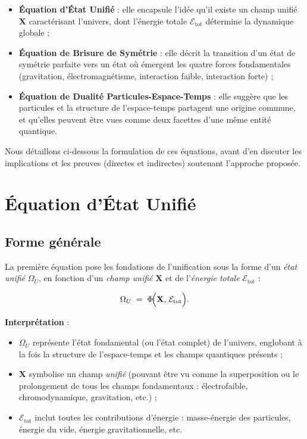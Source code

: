 \documentclass[12pt]{article}
\begin{document}
\begin{itemize}
    \item \textbf{Équation d'État Unifié} : elle encapsule l'idée qu'il existe un champ unifié 
          $\mathbf{X}$ caractérisant l'univers, dont l'énergie totale $\mathcal{E}_\mathrm{tot}$ 
          détermine la dynamique globale ;
    \item \textbf{Équation de Brisure de Symétrie} : elle décrit la transition d'un état de 
          symétrie parfaite vers un état où émergent les quatre forces fondamentales (gravitation, 
          électromagnétisme, interaction faible, interaction forte) ;
    \item \textbf{Équation de Dualité Particules-Espace-Temps} : elle suggère que les 
          particules et la structure de l'espace-temps partagent une origine commune, et 
          qu'elles peuvent être vues comme deux facettes d'une même entité quantique.
\end{itemize}

Nous détaillons ci-dessous la formulation de ces équations, avant d'en discuter 
les implications et les preuves (directes et indirectes) soutenant l'approche proposée.

\section{Équation d'État Unifié}

\subsection{Forme générale}

La première équation pose les fondations de l'unification sous la forme d'un \emph{état unifié} 
$\Omega_U$, en fonction d'un \emph{champ unifié} $\mathbf{X}$ et de l'\emph{énergie totale} 
$\mathcal{E}_{\mathrm{tot}}$ :

\begin{equation}
\label{eq:etat_unifie}
\Omega_U \;=\; \Phi\!\Bigl(\mathbf{X},\, \mathcal{E}_{\mathrm{tot}}\Bigr).
\end{equation}

\noindent
\textbf{Interprétation} :
\begin{itemize}
    \item $\Omega_U$ représente l'état fondamental (ou l'état complet) de l'univers, 
    englobant à la fois la structure de l'espace-temps et les champs quantiques présents ;
    \item $\mathbf{X}$ symbolise un champ \emph{unifié} (pouvant être vu comme la 
    superposition ou le prolongement de tous les champs fondamentaux : électrofaible, chromodynamique, 
    gravitation, etc.) ;
    \item $\mathcal{E}_{\mathrm{tot}}$ inclut toutes les contributions d'énergie : 
    masse-énergie des particules, énergie du vide, énergie gravitationnelle, etc.
\end{itemize}
\end{document}
